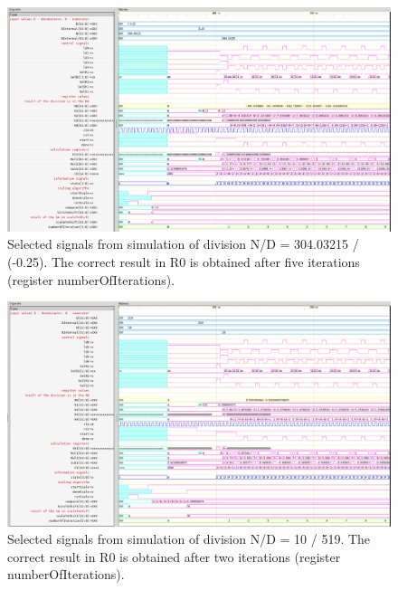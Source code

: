 \documentclass[a4paper, twoside, 11pt]{article}
\begin{document}
\begin{figure}[htbp!]
  \centering
  \includegraphics[width=1\textwidth]{src/png/inverted/division-304-03215-div-min-0-25.png}
    \caption{Selected signals from simulation of division N/D = 304.03215 / (-0.25). The correct result in R0 is obtained after five iterations (register numberOfIterations).}
  \label{fig:division-304-03215-div-min-0-25}
\end{figure}

\begin{figure}[htbp!]
  \centering
  \includegraphics[width=1\textwidth]{src/png/inverted/division-10-div-519.png}
    \caption{Selected signals from simulation of division N/D = 10 / 519. The correct result in R0 is obtained after two iterations (register numberOfIterations).}
  \label{fig:division-10-div-519}
\end{figure}
\end{document}
